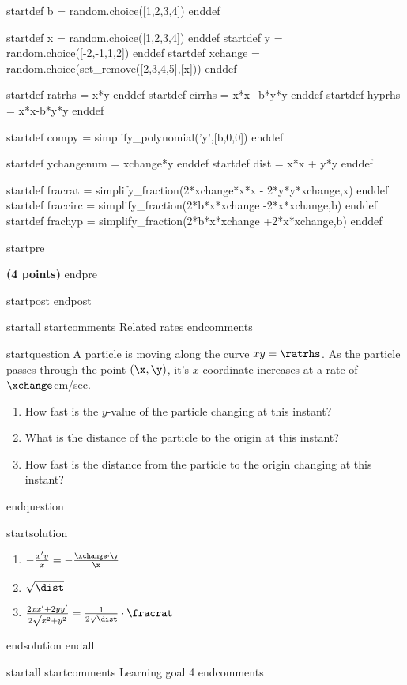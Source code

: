 startdef b = random.choice([1,2,3,4]) enddef

startdef x = random.choice([1,2,3,4]) enddef
startdef y = random.choice([-2,-1,1,2]) enddef
startdef xchange = random.choice(set_remove([2,3,4,5],[x])) enddef

startdef ratrhs = x*y enddef
startdef cirrhs = x*x+b*y*y enddef
startdef hyprhs = x*x-b*y*y enddef

startdef compy = simplify_polynomial('y',[b,0,0]) enddef

startdef ychangenum = xchange*y enddef
startdef dist = x*x + y*y enddef

startdef fracrat = simplify_fraction(2*xchange*x*x - 2*y*y*xchange,x) enddef
startdef fraccirc = simplify_fraction(2*b*x*xchange -2*x*xchange,b) enddef 
startdef frachyp = simplify_fraction(2*b*x*xchange +2*x*xchange,b) enddef 



startpre
\item {\bf (4 points)} 
endpre

startpost
endpost



startall
startcomments 
Related rates
endcomments

startquestion A particle is moving along the curve $xy = \ratrhs$. As the particle passes through the point $(\x,\y)$, it's $x$-coordinate increases at a rate of $\xchange$cm/sec. \begin{enumerate}
\item How fast is the $y$-value of the particle changing at this instant? \vfill \vfill
\item What is the distance of the particle to the origin at this instant? \vfill
\item How fast is the distance from the particle to the origin changing at this instant? \vfill \vfill
\end{enumerate}
endquestion

startsolution
\item \begin{enumerate}
\item $-\frac{x'y}{x} = -\frac{\xchange \cdot \y}{\x}$
\item $\sqrt{\dist}$
\item $\frac{2xx'+2yy'}{2\sqrt{x^2+y^2}} = \frac{1}{2\sqrt{\dist}} \cdot \fracrat$
\end{enumerate}
endsolution
endall




startall
startcomments 
Learning goal 4
endcomments

